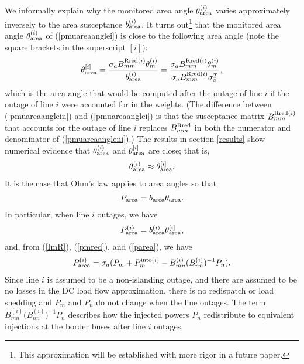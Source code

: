 \documentclass[conference]{IEEEtran}
\begin{document}
We informally explain why the monitored area angle $\theta_{\rm area}^{(i)}$ varies approximately inversely to the area susceptance $b_{\rm area}^{(i)}$.
It turns out\footnote{This approximation will be established with more rigor in a future paper.} that the monitored area angle $\theta_{\rm area}^{(i)}$ of (\ref{pmuareaanglei}) is close to 
the following area angle (note the square brackets in the superscript $[i]$):
\begin{align}
\theta_{\rm area}^{[i]}=\frac{\sigma_a B_{mm}^ {{\rm Rred}(i)} \theta_m^{(i)}}{b_{\rm area}^{(i)}}=\frac{\sigma_a B_{mm}^ {{\rm Rred}(i)}\theta_m^{(i)}}{\sigma_a B_{mm}^ {{\rm Rred}(i)}\sigma_a^T }
,\label{pmuareaangleiii}
\end{align}
which is the area angle that would be computed after the outage of line $i$ if the 
outage of  line $i$ were accounted for in the weights. (The difference between (\ref{pmuareaangleiii}) and (\ref{pmuareaanglei})
is that the susceptance matrix  $B_{mm}^ {{\rm Rred}(i)}$ that accounts for the outage of line $i$ replaces $B_{mm}^ {\rm Rred}$ in 
both the numerator and denominator of (\ref{pmuareaangleiii}).)
The results in section \ref{results} show numerical evidence that 
$\theta_{\rm area}^{(i)}$ and $\theta_{\rm area}^{[i]}$ are close; that is,
\begin{align}
\theta_{\rm area}^{(i)}\approx \theta_{\rm area}^{[i]}.
\end{align}
It is the case \cite{DobsonvoltPS12} that Ohm's law applies to area angles so that 
\begin{align}
P_{\rm area}=b_{\rm area} \theta_{\rm area}.
\label{ohm}
\end{align}
In particular, when line $i$ outages, we have 
 \begin{align}
 P^{(i)}_{\rm area}=b^{(i)}_{\rm area} \theta^{[i]}_{\rm area},
 \label{ohmi}
 \end{align} and, from (\ref{ImR}), (\ref{pmred}), and (\ref{parea}), we have 
  \begin{align}
 P^{(i)}_{\rm area}=\sigma_a (P_m+P_m^{{\rm into}(i)}- B_{mn}^{(i)}{(B^{(i)}_{nn}})^{-1}P_{n}).
 \label{pareaiex}
 \end{align}
 Since line $i$ is assumed to be a non-islanding outage, and there are assumed to be no losses in the DC load flow approximation, there is no redispatch or load shedding 
 and $P_m$ and $P_n$ do not change when the line outages.
 The term $B_{{m}n}^{(i)}{(B^{(i)}_{nn}})^{-1}P_{n}$ describes how the injected powers $P_n$ 
 redistribute to equivalent injections at the border buses after line $i$ outages,
\end{document}
